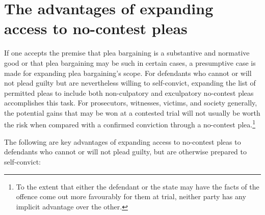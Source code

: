 \section{The advantages of expanding access to no-contest pleas}

If one accepts the premise that plea bargaining is a substantive and normative good or that plea bargaining may be such in certain cases, a presumptive case is made for expanding plea bargaining's scope. For defendants who cannot or will not plead guilty but are nevertheless willing to self-convict, expanding the list of permitted pleas to include both non-culpatory and exculpatory no-contest pleas accomplishes this task. For prosecutors, witnesses, victims, and society generally, the potential gains that may be won at a contested trial will not usually be worth the risk when compared with a confirmed conviction through a no-contest plea.\footnote{To the extent that either the defendant or the state may have the facts of the offence come out more favourably for them at trial, neither party has any implicit advantage over the other.}

The following are key advantages of expanding access to no-contest pleas to defendants who cannot or will not plead guilty, but are otherwise prepared to self-convict:

